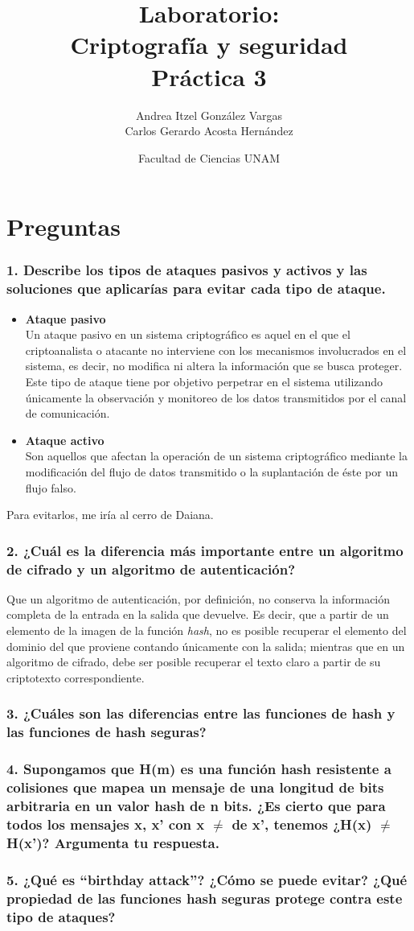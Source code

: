 \documentclass[12pt]{article}
\title{Laboratorio: \\Criptografía y seguridad \\ Práctica 3}
\author{Andrea Itzel González Vargas \\ Carlos Gerardo Acosta Hernández}
\date{Facultad de Ciencias UNAM}
\begin{document}
\maketitle
\section*{Preguntas}
\subsubsection*{1. Describe los tipos de ataques pasivos y activos y las soluciones que aplicarías para evitar cada tipo de ataque.}
\begin{itemize}
\item \textbf{Ataque pasivo}\\
  Un ataque pasivo en un sistema criptográfico es aquel en el que el
  criptoanalista o atacante no interviene con los mecanismos involucrados en el sistema, es decir, no modifica ni altera la información que se
  busca proteger. Este tipo de ataque tiene por objetivo perpetrar
  en el sistema utilizando únicamente la observación y monitoreo de
  los datos transmitidos por el canal de comunicación. 
\item \textbf{Ataque activo}\\
  Son aquellos que afectan la operación de un sistema criptográfico
  mediante la modificación del flujo de datos transmitido o la
  suplantación de éste por un flujo falso.
\end{itemize}
Para evitarlos, me iría al cerro de Daiana.
\subsubsection*{2. ¿Cuál es la diferencia más importante entre un algoritmo de cifrado y un algoritmo de autenticación?}
Que un algoritmo de autenticación, por definición, no conserva la información completa de la entrada en la salida que devuelve. Es decir, que
a partir de un elemento de la imagen de la función \textit{hash}, no es posible recuperar el elemento del dominio del que proviene contando únicamente con la salida;
mientras que en un algoritmo de cifrado, debe ser posible recuperar el texto claro a partir de su criptotexto correspondiente.
\subsubsection*{3. ¿Cuáles son las diferencias entre las funciones de hash y las funciones de hash seguras?}
\subsubsection*{4. Supongamos que H(m) es una función hash resistente a colisiones que mapea un mensaje de una longitud de bits arbitraria en un valor hash de n bits. ¿Es cierto que para todos los mensajes x, x’ con x $\neq$ de x’, tenemos ¿H(x) $\neq$ H(x')? Argumenta tu respuesta.}
\subsubsection*{5. ¿Qué es “birthday attack”? ¿Cómo se puede evitar? ¿Qué propiedad de las funciones hash seguras protege contra este tipo de ataques?}
\end{document}
